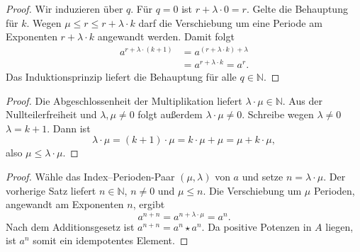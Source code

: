 \documentclass[main.tex]{subfiles}
\begin{document}
\begin{proof}
Wir induzieren über \(q\).  Für \(q=0\) ist
\(r+\lambda\cdot0=r\).  Gelte die Behauptung für \(k\).  Wegen
\(\mu\leq r\leq r+\lambda\cdot k\) darf die Verschiebung um eine Periode am
Exponenten \(r+\lambda\cdot k\) angewandt werden.  Damit folgt
\[
\begin{aligned}
a^{r+\lambda\cdot(k+1)}
 &=a^{(r+\lambda\cdot k)+\lambda}\\
 &=a^{r+\lambda\cdot k}
 =a^r.
\end{aligned}
\]
Das Induktionsprinzip liefert die Behauptung für alle \(q\in\mathbb N\).
\end{proof}

\begin{proof}
Die Abgeschlossenheit der Multiplikation liefert
\(\lambda\cdot\mu\in\mathbb N\).  Aus der Nullteilerfreiheit und
\(\lambda,\mu\neq0\) folgt außerdem
\(\lambda\cdot\mu\neq0\).  Schreibe wegen \(\lambda\neq0\)
\(\lambda=k+1\).  Dann ist
\[
  \lambda\cdot\mu
  =(k+1)\cdot\mu
  =k\cdot\mu+\mu
  =\mu+k\cdot\mu,
\]
also \(\mu\leq\lambda\cdot\mu\).
\end{proof}


\begin{proof}
Wähle das Index--Perioden-Paar \((\mu,\lambda)\) von \(a\) und setze
\(n=\lambda\cdot\mu\).  Der vorherige Satz liefert
\(n\in\mathbb N\), \(n\neq0\) und \(\mu\leq n\).  Die Verschiebung um
\(\mu\) Perioden, angewandt am Exponenten \(n\), ergibt
\[
  a^{n+n}
  =a^{n+\lambda\cdot\mu}
  =a^n.
\]
Nach dem Additionsgesetz ist \(a^{n+n}=a^n\star a^n\).  Da positive
Potenzen in \(A\) liegen, ist \(a^n\) somit ein idempotentes Element.
\end{proof}
\end{document}
